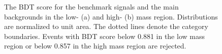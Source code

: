 \begin{figure}[htbp]
    \centering
    \caption{The BDT score for the benchmark signals and the main backgrounds in the low- (a) and high- (b) mass region. Distributions are normalized to unit area. The dotted lines denote the category boundaries. Events with BDT score below 0.881 in the low mass region or below 0.857 in the high mass region are rejected.}
    \label{fig:HHyybb:ObjEvt:Evt:dBDT}
\end{figure}

